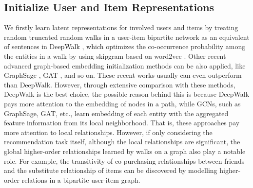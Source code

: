 \subsection{Initialize User and Item Representations}
\label{subsec3.2}
We firstly learn latent representations for involved users and items by treating random truncated random walks in a user-item bipartite network as an equivalent of sentences in DeepWalk \cite{perozzi2014deepwalk}, which optimizes the co-occurrence probability among the entities in a walk by using skipgram based on word2vec \cite{mikolov2013efficient}. Other recent advanced graph-based embedding initialization methods can be also applied, like GraphSage \cite{graphsage}, GAT \cite{velivckovic2017graph}, and so on. These recent works usually can even outperform than DeepWalk. However, through extensive comparison with these methods, DeepWalk is the best choice, the possible reason behind this is because DeepWalk pays more attention to the embedding of nodes in a path, while GCNs, such as GraphSage, GAT, etc., learn embedding of each entity with the aggregated feature information from its local neighborhood. That is, these approaches pay more attention to local relationships. However, if only considering the recommendation task itself, although the local relationships are significant, the global higher-order relationships learned by walks on a graph also play a notable role. For example, the transitivity of co-purchasing relationships between friends and the substitute relationship of items can be discovered by modelling higher-order relations in a bipartite user-item graph. 




